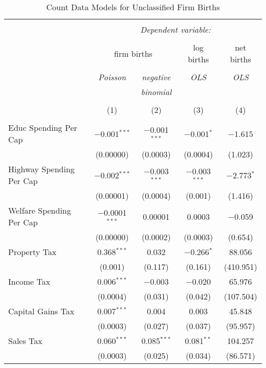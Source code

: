 
\begin{table}[!htbp] \centering 
  \caption{Count Data Models for Unclassified Firm Births} 
  \label{} 
\begin{tabular}{@{\extracolsep{5pt}}lcccc} 
\\[-1.8ex]\hline 
\hline \\[-1.8ex] 
 & \multicolumn{4}{c}{\textit{Dependent variable:}} \\ 
\cline{2-5} 
\\[-1.8ex] & \multicolumn{2}{c}{firm births} & log births & net births \\ 
\\[-1.8ex] & \textit{Poisson} & \textit{negative} & \textit{OLS} & \textit{OLS} \\ 
 & \textit{} & \textit{binomial} & \textit{} & \textit{} \\ 
\\[-1.8ex] & (1) & (2) & (3) & (4)\\ 
\hline \\[-1.8ex] 
 Educ Spending Per Cap & $-$0.001$^{***}$ & $-$0.001$^{***}$ & $-$0.001$^{*}$ & $-$1.615 \\ 
  & (0.00000) & (0.0003) & (0.0004) & (1.023) \\ 
  Highway Spending Per Cap  & $-$0.002$^{***}$ & $-$0.003$^{***}$ & $-$0.003$^{***}$ & $-$2.773$^{*}$ \\ 
  & (0.00001) & (0.0004) & (0.001) & (1.416) \\ 
  Welfare Spending Per Cap  & $-$0.0001$^{***}$ & 0.00001 & 0.0003 & $-$0.059 \\ 
  & (0.00000) & (0.0002) & (0.0003) & (0.654) \\ 
  Property Tax & 0.368$^{***}$ & 0.032 & $-$0.266$^{*}$ & 88.056 \\ 
  & (0.001) & (0.117) & (0.161) & (410.951) \\ 
  Income Tax & 0.006$^{***}$ & $-$0.003 & $-$0.020 & 65.976 \\ 
  & (0.0004) & (0.031) & (0.042) & (107.504) \\ 
  Capital Gains Tax & 0.007$^{***}$ & 0.004 & 0.003 & 45.848 \\ 
  & (0.0003) & (0.027) & (0.037) & (95.957) \\ 
  Sales Tax & 0.060$^{***}$ & 0.085$^{***}$ & 0.081$^{**}$ & 104.257 \\ 
  & (0.0003) & (0.025) & (0.034) & (86.571) \\ 

\end{tabular}
\end{table}
